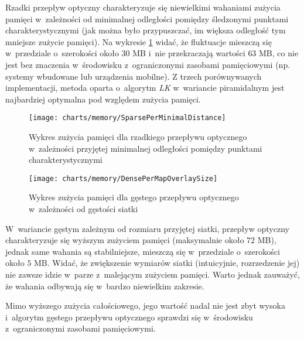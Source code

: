     Rzadki przepływ optyczny charakteryzuje się niewielkimi wahaniami zużycia pamięci w~zależności od minimalnej odległości pomiędzy śledzonymi punktami charakterystycznymi (jak można było przypuszczać, im większa odległość tym mniejsze zużycie pamięci). Na wykresie \ref{fig:SparseOpticalFlowPerMinimalDistanceBetweenPoints} widać, że fluktuacje mieszczą się w~przedziale o~szerokości około $30$ MB i~nie przekraczają wartości $63$ MB, co nie jest bez znaczenia w~środowisku z~ograniczonymi zasobami pamięciowymi (np. systemy wbudowane lub urządzenia mobilne). Z trzech porównywanych implementacji, metoda oparta o~algorytm \textit{LK} w~wariancie piramidalnym jest najbardziej optymalna pod względem zużycia pamięci.

      \begin{figure}[!ht]
        \centering
        \texttt{[image: charts/memory/SparsePerMinimalDistance]}
        \caption[Wykres zużycia pamięci dla rzadkiego przepływu optycznego w~zależności przyjętej minimalnej odległości pomiędzy punktami charakterystycznymi]
                {Wykres zużycia pamięci dla rzadkiego przepływu optycznego w~zależności przyjętej minimalnej odległości pomiędzy punktami charakterystycznymi}
        \label{fig:SparseOpticalFlowPerMinimalDistanceBetweenPoints}
      \end{figure}

      \begin{figure}[!ht]
        \centering
        \texttt{[image: charts/memory/DensePerMapOverlaySize]}
        \caption[Wykres zużycia pamięci dla gęstego przepływu optycznego w~zależności od gęstości siatki]
                {Wykres zużycia pamięci dla gęstego przepływu optycznego w~zależności od gęstości siatki}
        \label{fig:DenseOpticalFlowPerMapSize}
      \end{figure}

    \newpage

    W~wariancie gęstym zależnym od rozmiaru przyjętej siatki, przepływ optyczny charakteryzuje się wyższym zużyciem pamięci (maksymalnie około $72$ MB), jednak same wahania są stabilniejsze, mieszczą się w~przedziale o~szerokości około $5$ MB. Widać, że zwiększenie wymiarów siatki (intuicyjnie, rozrzedzenie jej) nie zawsze idzie w~parze z~malejącym zużyciem pamięci. Warto jednak zauważyć, że wahania odbywają się w~bardzo niewielkim zakresie.

    Mimo wyższego zużycia całościowego, jego wartość nadal nie jest zbyt wysoka i~algorytm gęstego przepływu optycznego sprawdzi się w~środowisku z~ograniczonymi zasobami pamięciowymi.

